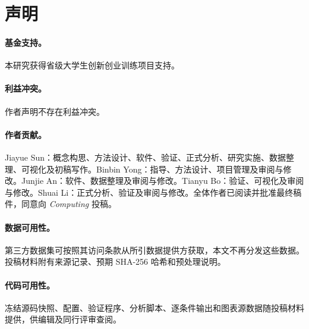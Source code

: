 \documentclass[smallextended]{svjour3}
\begin{document}
\section*{声明}
\paragraph{基金支持。}本研究获得省级大学生创新创业训练项目支持。
\paragraph{利益冲突。}作者声明不存在利益冲突。
\paragraph{作者贡献。}Jiayue Sun：概念构思、方法设计、软件、验证、正式分析、研究实施、数据整理、可视化及初稿写作。Binbin Yong：指导、方法设计、项目管理及审阅与修改。Junjie An：软件、数据整理及审阅与修改。Tianyu Bo：验证、可视化及审阅与修改。Shuai Li：正式分析、验证及审阅与修改。全体作者已阅读并批准最终稿件，同意向 \textit{Computing} 投稿。
\paragraph{数据可用性。}第三方数据集可按照其访问条款从所引数据提供方获取，本文不再分发这些数据。投稿材料附有来源记录、预期 SHA-256 哈希和预处理说明。
\paragraph{代码可用性。}冻结源码快照、配置、验证程序、分析脚本、逐条件输出和图表源数据随投稿材料提供，供编辑及同行评审查阅。

\end{document}
